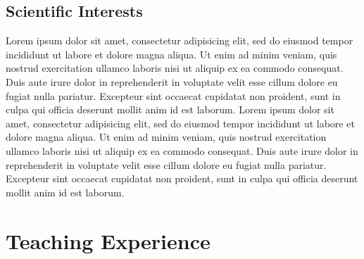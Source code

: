 \documentclass[11pt]{moderncv}
\begin{document}
\subsection{Scientific Interests}
%
{Lorem ipsum dolor sit amet, consectetur adipisicing elit, sed do
  eiusmod tempor incididunt ut labore et dolore magna aliqua. Ut enim
  ad minim veniam, quis nostrud exercitation ullamco laboris nisi ut
  aliquip ex ea commodo consequat. Duis aute irure dolor in
  reprehenderit in voluptate velit esse cillum dolore eu fugiat nulla
  pariatur. Excepteur sint occaecat cupidatat non proident, sunt in
  culpa qui officia deserunt mollit anim id est laborum.}
%
%
{Lorem ipsum dolor sit amet, consectetur adipisicing elit, sed do
  eiusmod tempor incididunt ut labore et dolore magna aliqua. Ut enim
  ad minim veniam, quis nostrud exercitation ullamco laboris nisi ut
  aliquip ex ea commodo consequat. Duis aute irure dolor in
  reprehenderit in voluptate velit esse cillum dolore eu fugiat nulla
  pariatur. Excepteur sint occaecat cupidatat non proident, sunt in
  culpa qui officia deserunt mollit anim id est laborum.}


\section{Teaching Experience}
\end{document}
